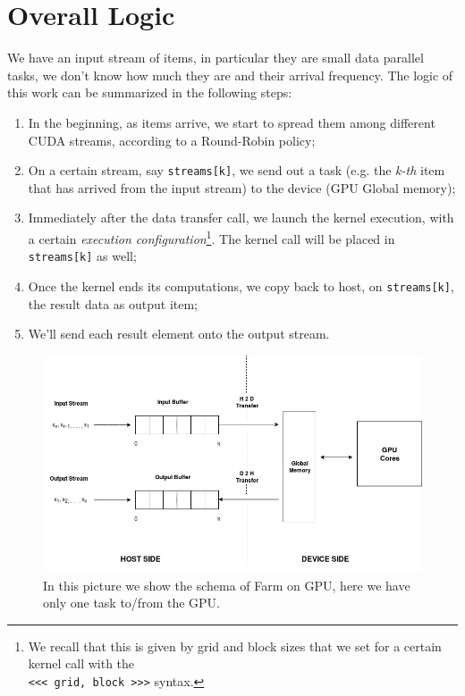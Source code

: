 \section{Overall Logic}
\label{sect:overallLogic}
We have an input stream of items, in particular they are small data parallel tasks, we don't know how much they are and their arrival frequency.
The logic of this work can be summarized in the following steps:
\begin{enumerate}
	\item In the beginning, as items arrive, we start to spread them among different CUDA streams, according to a Round-Robin policy;
	\item On a certain stream, say \texttt{streams[k]}, we send out a task (e.g. the \textit{k-th} item that has arrived from the input stream) to the device (GPU Global memory);
	\item Immediately after the data transfer call, we launch the kernel execution, with a certain \textit{execution configuration}\footnote{We recall that this is given by grid and block sizes that we set for a certain kernel call with the\\ \texttt{<<< grid, block >>>} syntax.}. The kernel call will be placed in \texttt{streams[k]} as well;
	\item Once the kernel ends its computations, we copy back to host, on \texttt{streams[k]}, the result data as output item;
	\item We'll send each result element onto the output stream. 
\end{enumerate}

	\begin{figure}
		\includegraphics[width=\linewidth]{images/H2D.jpg}
		\caption{In this picture we show the schema of Farm on GPU, here we have only one task to/from the GPU.}
		\label{fig:H2D}
	\end{figure}
	
